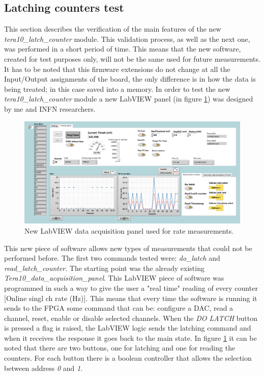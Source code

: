 \subsection{Latching counters test}\label{latchtests}
This section describes the verification of the main features of the new \textit{tera10\_latch\_counter} module.
This validation process, as well as the next one, was performed in a short period of time. This means that the new software, created for test purposes only, will not be the same used for future measurements.
It has to be noted that this firmware extensions do not change at all the Input/Output assignments of the board, the only difference is in how the data is being treated; in this case saved into a memory.
In order to test the new \textit{tera10\_latch\_counter} module a new LabVIEW panel (in figure \ref{fig:newlabviewpanel}) was designed by me and INFN researchers.
\begin{figure}[H]
	\centering
	\includegraphics[width=0.99\linewidth]{IMG/ch5/latch_tests/fig1.PNG}
	\caption{New LabVIEW data acquisition panel used for rate measurements.}
	\label{fig:newlabviewpanel}
\end{figure}
\noindent This new piece of software allows new types of measurements that could not be performed before.
The first two commands tested were: \textit{do\_latch} and \textit{read\_latch\_counter}. The starting point was the already existing \textit{Tera10\_data\_acquisition\_panel}. This LabVIEW piece of software was programmed in such a way to give the user a "real time" reading of every counter [Online singl ch rate (Hz)].
This means that every time the software is running it sends to the FPGA some command that can be: configure a DAC, read a channel, reset, enable or disable selected channels.
When the \textit{DO LATCH} button is pressed a flag is raised, the LabVIEW logic sends the latching command and when it receives the response it goes back to the main state.
In figure \ref{fig:newlabviewpanel} it can be noted that there are two buttons, one for latching and one for reading the counters. For each button there is a boolean controller that allows the selection between address \textit{0} and \textit{1}.
